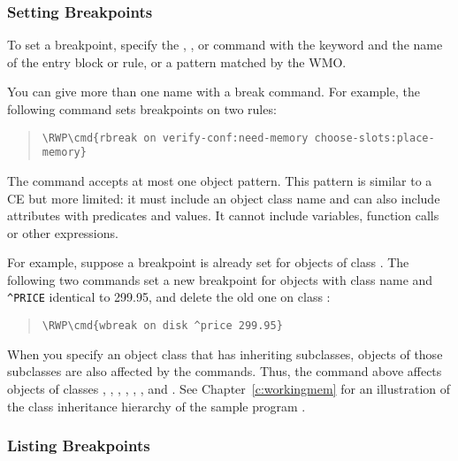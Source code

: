 \subsubsection{Setting Breakpoints}

To set a breakpoint, specify the , , or
 command with the keyword  and the name of the entry
block or rule, or a pattern matched by the WMO.

You can give more than one name with a break command. For example, the
following command sets breakpoints on two rules:
\begin{quote}
\begin{Verbatim}[commandchars=\\\{\}]
\RWP\cmd{rbreak on verify-conf:need-memory choose-slots:place-memory}
\end{Verbatim}
\end{quote}

The  command accepts at most one object pattern. This
pattern is similar to a CE but more limited: it must include an
object class name and can also include attributes with
predicates and values. It cannot include variables, function
calls or other expressions.

For example, suppose a breakpoint is already set for objects of class
. The following two commands set a new breakpoint for objects
with class name  and \verb|^PRICE| identical to 299.95, and delete
the old one on class :

\begin{quote}
\begin{Verbatim}[commandchars=\\\{\}]
\RWP\cmd{wbreak on disk ^price 299.95}
\end{Verbatim}
\end{quote}

When you specify an object class that has inheriting subclasses,
objects of those subclasses are also affected by the 
commands. Thus, the command above affects objects of classes
, , , , ,
, and . See Chapter~\ref{c:workingmem} for an
illustration of the class inheritance hierarchy of the sample program
.

\subsubsection{Listing Breakpoints}

